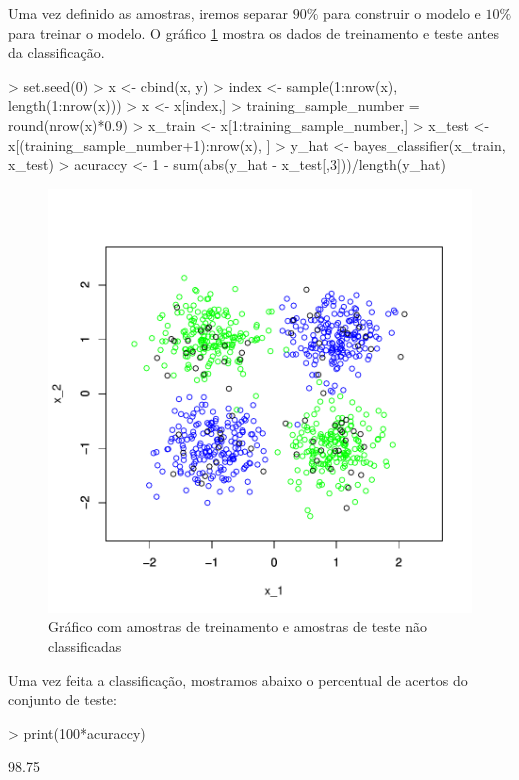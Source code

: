 \documentclass[12pt]{article}
\begin{document}
\par Uma vez definido as amostras, iremos separar $90\%$ para construir o modelo e $10\%$ para treinar o modelo. O gráfico \ref{tre_tst2} mostra os dados de treinamento e teste antes da classificação.

\begin{Schunk}
\begin{Sinput}
> set.seed(0)
> x <- cbind(x, y)
> index <- sample(1:nrow(x), length(1:nrow(x)))
> x <- x[index,]
> training_sample_number = round(nrow(x)*0.9)
> x_train <- x[1:training_sample_number,]
> x_test <- x[(training_sample_number+1):nrow(x), ]
> y_hat <- bayes_classifier(x_train, x_test)
> acuraccy <- 1 - sum(abs(y_hat - x_test[,3]))/length(y_hat)
\end{Sinput}
\end{Schunk}

\begin{figure}[h]
\centering
\includegraphics{BayesClassifier-011}
\caption{Gráfico com amostras de treinamento e amostras de teste não classificadas}
\label{tre_tst2}
\end{figure}

\par Uma vez feita a classificação, mostramos abaixo o percentual de acertos do conjunto de teste:
\begin{Schunk}
\begin{Sinput}
> print(100*acuraccy)
\end{Sinput}
\begin{Soutput}
[1] 98.75
\end{Soutput}
\end{Schunk}
\end{document}
